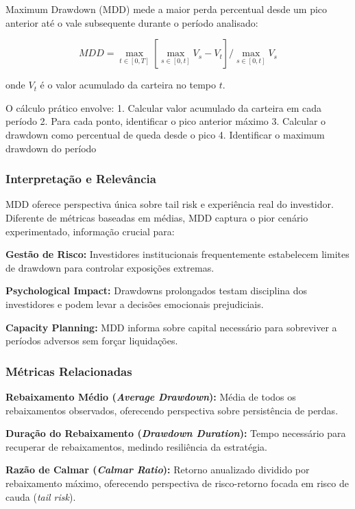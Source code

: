 Maximum Drawdown (MDD) mede a maior perda percentual desde um pico anterior até o vale subsequente durante o período analisado:

\begin{equation}
MDD = \max_{t \in [0,T]} \left[ \max_{s \in [0,t]} V_s - V_t \right] / \max_{s \in [0,t]} V_s
\end{equation}

onde $V_t$ é o valor acumulado da carteira no tempo $t$.

O cálculo prático envolve:
1. Calcular valor acumulado da carteira em cada período
2. Para cada ponto, identificar o pico anterior máximo
3. Calcular o drawdown como percentual de queda desde o pico
4. Identificar o maximum drawdown do período

\subsubsection{Interpretação e Relevância}

MDD oferece perspectiva única sobre tail risk e experiência real do investidor. Diferente de métricas baseadas em médias, MDD captura o pior cenário experimentado, informação crucial para:

\textbf{Gestão de Risco:} Investidores institucionais frequentemente estabelecem limites de drawdown para controlar exposições extremas.

\textbf{Psychological Impact:} Drawdowns prolongados testam disciplina dos investidores e podem levar a decisões emocionais prejudiciais.

\textbf{Capacity Planning:} MDD informa sobre capital necessário para sobreviver a períodos adversos sem forçar liquidações.

\subsubsection{Métricas Relacionadas}

\textbf{Rebaixamento Médio (\textit{Average Drawdown}):} Média de todos os rebaixamentos observados, oferecendo perspectiva sobre persistência de perdas.

\textbf{Duração do Rebaixamento (\textit{Drawdown Duration}):} Tempo necessário para recuperar de rebaixamentos, medindo resiliência da estratégia.

\textbf{Razão de Calmar (\textit{Calmar Ratio}):} Retorno anualizado dividido por rebaixamento máximo, oferecendo perspectiva de risco-retorno focada em risco de cauda (\textit{tail risk}).

